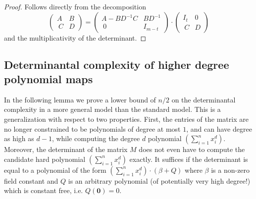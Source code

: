 \documentclass[10pt,a4paper]{article}
\begin{document}
\begin{proof}
Follows directly from the decomposition
\[ \begin{pmatrix}
   A & B\\\
C & D
 \end{pmatrix}
 =
 \begin{pmatrix}
   A - BD^{-1}C & BD^{-1}\\\
0 & I_{m-t}
 \end{pmatrix}
 \cdot 
  \begin{pmatrix}
   I_t & 0\\\
C & D
 \end{pmatrix}
 \]
 and the multiplicativity of the determinant.
\end{proof}


\subsection{Determinantal complexity of higher degree polynomial maps}\label{sec:lb for higher deg maps}

In the following lemma we prove a lower bound of $n/2$ on the determinantal complexity in a more general model than the standard model. This is a generalization with respect to two properties. First, the entries of the matrix are no longer constrained to be polynomials of degree at most $1$, and can have degree as high as $d-1$, while computing the degree $d$ polynomial $\left(\sum_{i = 1}^n x_i^d\right)$. Moreover, the determinant of the matrix $M$ does not even have to compute the candidate hard polynomial $\left(\sum_{i = 1}^n x_i^d\right)$ exactly. It suffices if the determinant is equal to a polynomial of the form $\left(\sum_{i = 1}^n x_i^d\right) \cdot (\beta + Q)$ where $\beta$ is a non-zero field constant and $Q$ is an arbitrary polynomial (of potentially very high degree!) which is constant free, i.e. $Q(\mathbf{0}) = 0$.  
\end{document}
